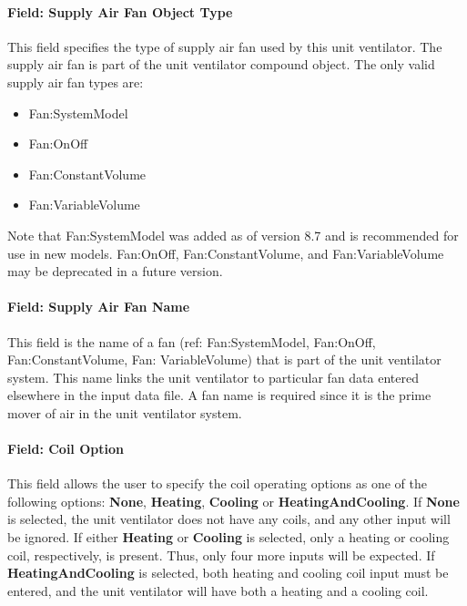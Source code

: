 \paragraph{Field: Supply Air Fan Object Type}\label{field-supply-air-fan-object-type-1-000}

This field specifies the type of supply air fan used by this unit ventilator. The supply air fan is part of the unit ventilator compound object. The only valid supply air fan types are:

\begin{itemize}
\item
  Fan:SystemModel
\item
  Fan:OnOff
\item
  Fan:ConstantVolume
\item
  Fan:VariableVolume
\end{itemize}

Note that Fan:SystemModel was added as of version 8.7 and is recommended for use in new models.  Fan:OnOff, Fan:ConstantVolume, and Fan:VariableVolume may be deprecated in a future version.

\paragraph{Field: Supply Air Fan Name}\label{field-supply-air-fan-name-1-000}

This field is the name of a fan (ref: Fan:SystemModel, Fan:OnOff, Fan:ConstantVolume, Fan: VariableVolume) that is part of the unit ventilator system. This name links the unit ventilator to particular fan data entered elsewhere in the input data file. A fan name is required since it is the prime mover of air in the unit ventilator system.

\paragraph{Field: Coil Option}\label{field-coil-option}

This field allows the user to specify the coil operating options as one of the following options: \textbf{None}, \textbf{Heating}, \textbf{Cooling} or \textbf{HeatingAndCooling}. If \textbf{None} is selected, the unit ventilator does not have any coils, and any other input will be ignored. If either \textbf{Heating} or \textbf{Cooling} is selected, only a heating or cooling coil, respectively, is present. Thus, only four more inputs will be expected. If \textbf{HeatingAndCooling} is selected, both heating and cooling coil input must be entered, and the unit ventilator will have both a heating and a cooling coil.

